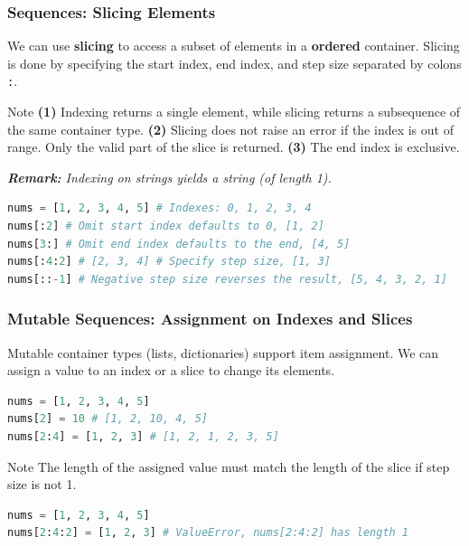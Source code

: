 \documentclass[beamer, en, version=2.0]{huangfusl-template}
\begin{document}
    \begin{frame}[fragile]
        \frametitle{Sequences: Slicing Elements}

        We can use \textbf{slicing} to access a subset of elements in a \textbf{ordered} container. Slicing is done by specifying the start index, end index, and step size separated by colons {\footnotesize\verb|:|}.

        \begin{block}{Note}
            \textbf{(1)} Indexing returns a single element, while slicing returns a subsequence of the same container type. \textbf{(2)} Slicing does not raise an error if the index is out of range. Only the valid part of the slice is returned. \textbf{(3)} The end index is exclusive.

            {\footnotesize\itshape\textbf{Remark:} Indexing on strings yields a string (of length 1).}
        \end{block}

\begin{lstlisting}[language=python]
nums = [1, 2, 3, 4, 5] # Indexes: 0, 1, 2, 3, 4
nums[:2] # Omit start index defaults to 0, [1, 2]
nums[3:] # Omit end index defaults to the end, [4, 5]
nums[:4:2] # [2, 3, 4] # Specify step size, [1, 3]
nums[::-1] # Negative step size reverses the result, [5, 4, 3, 2, 1]
\end{lstlisting}
    \end{frame}
    \begin{frame}[fragile]
        \frametitle{Mutable Sequences: Assignment on Indexes and Slices}

        Mutable container types (lists, dictionaries) support item assignment. We can assign a value to an index or a slice to change its elements.

\begin{lstlisting}[language=python]
nums = [1, 2, 3, 4, 5]
nums[2] = 10 # [1, 2, 10, 4, 5]
nums[2:4] = [1, 2, 3] # [1, 2, 1, 2, 3, 5]
\end{lstlisting}

        \begin{block}{Note}
            The length of the assigned value must match the length of the slice if step size is not 1.

\begin{lstlisting}[language=python]
nums = [1, 2, 3, 4, 5]
nums[2:4:2] = [1, 2, 3] # ValueError, nums[2:4:2] has length 1
\end{lstlisting}
        \end{block}
    \end{frame}
\end{document}
